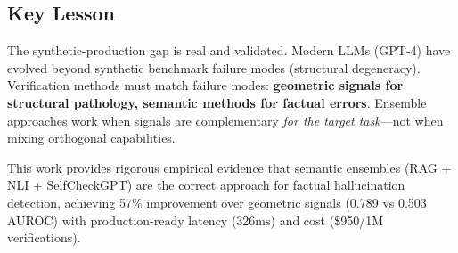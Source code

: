 \documentclass[11pt]{article}
\begin{document}
\subsection{Key Lesson}

The synthetic-production gap is real and validated. Modern LLMs (GPT-4) have evolved beyond synthetic benchmark failure modes (structural degeneracy). Verification methods must match failure modes: \textbf{geometric signals for structural pathology, semantic methods for factual errors}. Ensemble approaches work when signals are complementary \textit{for the target task}---not when mixing orthogonal capabilities.

This work provides rigorous empirical evidence that semantic ensembles (RAG + NLI + SelfCheckGPT) are the correct approach for factual hallucination detection, achieving 57\% improvement over geometric signals (0.789 vs 0.503 AUROC) with production-ready latency (326ms) and cost (\$950/1M verifications).
\end{document}

